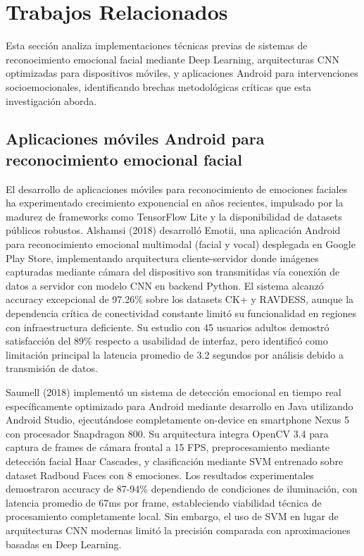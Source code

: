 \documentclass[journal,article,submit,pdftex,moreauthors]{Definitions/mdpi}
\begin{document}
	\section{Trabajos Relacionados}
	
	Esta sección analiza implementaciones técnicas previas de sistemas de reconocimiento emocional facial mediante Deep Learning, arquitecturas CNN optimizadas para dispositivos móviles, y aplicaciones Android para intervenciones socioemocionales, identificando brechas metodológicas críticas que esta investigación aborda.
	
	\subsection{Aplicaciones móviles Android para reconocimiento emocional facial}
	
	El desarrollo de aplicaciones móviles para reconocimiento de emociones faciales ha experimentado crecimiento exponencial en años recientes, impulsado por la madurez de frameworks como TensorFlow Lite y la disponibilidad de datasets públicos robustos. Alshamsi (2018) \cite{ref1} desarrolló Emotii, una aplicación Android para reconocimiento emocional multimodal (facial y vocal) desplegada en Google Play Store, implementando arquitectura cliente-servidor donde imágenes capturadas mediante cámara del dispositivo son transmitidas vía conexión de datos a servidor con modelo CNN en backend Python. El sistema alcanzó accuracy excepcional de 97.26\% sobre los datasets CK+ y RAVDESS, aunque la dependencia crítica de conectividad constante limitó su funcionalidad en regiones con infraestructura deficiente. Su estudio con 45 usuarios adultos demostró satisfacción del 89\% respecto a usabilidad de interfaz, pero identificó como limitación principal la latencia promedio de 3.2 segundos por análisis debido a transmisión de datos.
	
	Saumell (2018) \cite{ref2} implementó un sistema de detección emocional en tiempo real específicamente optimizado para Android mediante desarrollo en Java utilizando Android Studio, ejecutándose completamente on-device en smartphone Nexus 5 con procesador Snapdragon 800. Su arquitectura integra OpenCV 3.4 para captura de frames de cámara frontal a 15 FPS, preprocesamiento mediante detección facial Haar Cascades, y clasificación mediante SVM entrenado sobre dataset Radboud Faces con 8 emociones. Los resultados experimentales demostraron accuracy de 87-94\% dependiendo de condiciones de iluminación, con latencia promedio de 67ms por frame, estableciendo viabilidad técnica de procesamiento completamente local. Sin embargo, el uso de SVM en lugar de arquitecturas CNN modernas limitó la precisión comparada con aproximaciones basadas en Deep Learning.
	
\end{document}
